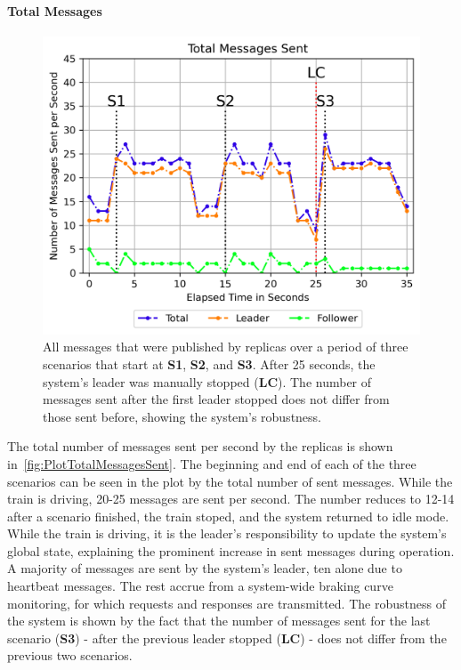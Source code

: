 \paragraph{Total Messages}

\begin{figure}[!hb]
	\centering
	\includegraphics[width=0.8\linewidth]{images/plots/TotalMessagesSent}
	\caption{All messages that were published by replicas over a period of three scenarios that start at \textbf{S1}, \textbf{S2}, and \textbf{S3}. After 25 seconds, the system's leader was manually stopped (\textbf{LC}). The number of messages sent after the first leader stopped does not differ from those sent before, showing the system's robustness.}
	\label{fig:PlotTotalMessagesSent}
\end{figure}

The total number of messages sent per second by the replicas is shown in~\autoref{fig:PlotTotalMessagesSent}.
The beginning and end of each of the three scenarios can be seen in the plot by the total number of sent messages.
While the train is driving, 20-25 messages are sent per second.
The number reduces to 12-14 after a scenario finished, the train stoped, and the system returned to idle mode.
While the train is driving, it is the leader's responsibility to update the system's global state, explaining the prominent increase in sent messages during operation.
A majority of messages are sent by the system's leader, ten alone due to heartbeat messages.
The rest accrue from a system-wide braking curve monitoring, for which requests and responses are transmitted.
The robustness of the system is shown by the fact that the number of messages sent for the last scenario (\textbf{S3}) - after the previous leader stopped (\textbf{LC}) - does not differ from the previous two scenarios.

